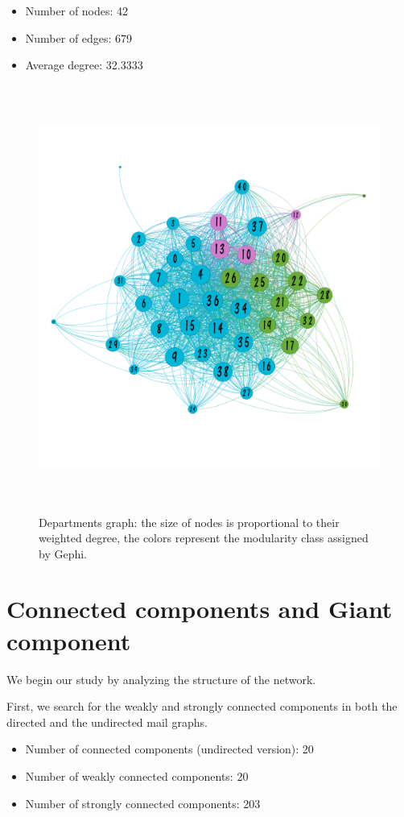 \documentclass{report}
\theoremstyle{definition}
\theoremstyle{remark}
\begin{document}
\begin{itemize}
	\item Number of nodes: 42
	\item Number of edges: 679
	\item Average degree: 32.3333
\end{itemize}
\begin{figure} [H]
	\centering
	\centerline{\includegraphics[width = 12cm, height = 14cm, keepaspectratio]{Departments_graph.png}}
	\caption{Departments graph: the size of nodes is proportional to their weighted degree, the colors represent the modularity class assigned by Gephi.} \label{fig:dep_graph}
\end{figure}
\section*{Connected components and Giant component}

We begin our study by analyzing the structure of the network.

First, we search for the weakly and strongly connected components in both the directed and the undirected mail graphs.
\begin{itemize}
	\item Number of connected components (undirected version): 20
	\item Number of weakly connected components: 20
	\item Number of strongly connected components: 203
\end{itemize}
\end{document}
